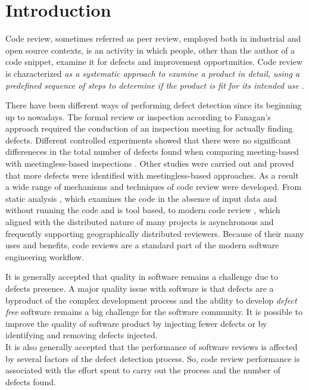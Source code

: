 \documentclass[ifip]{svmult}
\begin{document}
\section{Introduction}
\label{sec:1}

Code review, sometimes referred as peer review, employed both in industrial and open source contexts, 
is an activity in which people, other than the author of a code snippet, 
examine it for defects and improvement opportunities.
Code review is characterized \textit{ as a systematic approach to examine a product in detail, 
using a predefined sequence of steps to determine if the product is fit for its intended use}
\cite{contribution14}.

There have been different ways of performing defect detection since its beginning up to nowadays. The formal review or inspection 
according to Fanagan's \cite{contribution15} approach required the conduction of an inspection meeting for actually finding 
defects. Different controlled experiments showed that there were no significant differeneces in the total number of defects found 
when comparing meeting-based with meetingless-based inspections \cite{contribution17, contribution18}. Other 
studies \cite{contribution19} were carried out and proved that more defects were identified with meetingless-based approaches. 
As a result a wide range of mechanisms and techniques of code review were developed. From static analysis 
\cite{contribution3, contribution4, contribution5}, which examines the code in 
the absence of input data and without running the code and is tool based, to modern code review 
\cite{contribution6, contribution7, contribution8}, which aligned with the distributed 
nature of many projects is asynchronous and frequently supporting geographically distributed reviewers. Because of their many uses 
and benefits, code reviews are a standard part of the modern software engineering workflow.

It is generally accepted that quality in software remains a challenge due to defects presence. A major quality issue with 
software is that defects are a byproduct of the complex development process and the ability to develop 
\textit{defect free} software 
remains a big challenge for the software community. 
It is possible to improve the quality of software product by injecting fewer defects or by identifying and 
removing defects injected. 
\\
It is also generally accepted that the performance of software reviews is affected by several factors of the 
defect detection process. So, code review performance is associated with the effort spent to carry out the 
process and the number of defects found. 
\end{document}
